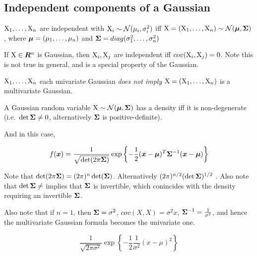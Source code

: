 \begin{tcolorbox}
    \section{Independent components of a Gaussian}
    
    ${\textnormal{X}}_1, \dots, {\textnormal{X}}_n$ are independent with ${\textnormal{X}}_i \sim {\mathcal{N}}(\mu_i, \sigma_i^2)$ iff ${\textnormal{X}} = ({\textnormal{X}}_1, \dots, {\textnormal{X}}_n) \sim {\mathcal{N}}({\bm{\mu}}, {\bm{\Sigma}})$, where ${\bm{\mu}} = (\mu_1, \dots, \mu_n)$ and ${\bm{\Sigma}} = diag(\sigma_1^2, \dots, \sigma_n^2)$
    
    \begin{thm} If ${\textnormal{X}} \in {\bm{R}}^n$ is Gaussian, then ${\textnormal{X}}_i, {\textnormal{X}}_j$ are independent iff $cov({\textnormal{X}}_i, {\textnormal{X}}_j) = 0$. Note this is not true in general, and is a special property of the Gaussian.
    
    \end{thm}
    
    \begin{thm}
    ${\textnormal{X}}_1, \dots, {\textnormal{X}}_n$ each univariate Gaussian \emph{does not imply} ${\textnormal{X}} = ({\textnormal{X}}_1, \dots, {\textnormal{X}}_n)$ is a multivariate Gaussian.
    
    \end{thm}
    
    \begin{thm}
    A Gaussian random variable ${\textnormal{X}} \sim {\mathcal{N}}({\bm{\mu}}, {\bm{\Sigma}})$ has a density iff it is non-degenerate (i.e.\ $\det {\bm{\Sigma}} \neq 0$, alternatively ${\bm{\Sigma}}$ is positive-definite).
    
    And in this case,
    
    \begin{equation}
        f({\bm{x}}) = \frac{1}{\sqrt{\det(2 \pi {\bm{\Sigma}})}} \exp{ \left\{ - \frac{1}{2} ({\bm{x}}- {\bm{\mu}})^T {\bm{\Sigma}}^{-1} ({\bm{x}}- {\bm{\mu}}) \right\} }
    \end{equation}
    
    Note that $\det(2 \pi {\bm{\Sigma}}) = (2\pi)^n \det({\bm{\Sigma}})$. Alternatively $(2 \pi)^{n/2} (\det {\bm{\Sigma}})^{1/2}$ . Also note that $\det {\bm{\Sigma}} \neq$ implies that ${\bm{\Sigma}}$ is invertible, which conincides with the density requiring an invertible ${\bm{\Sigma}}$.
    
    Also note that if $n = 1$, then ${\bm{\Sigma}} = \sigma^2$, $cov(X, X) = \sigma^2 x$, ${\bm{\Sigma}}^{-1} = \frac{1}{\sigma^2}$, and hence the multivariate Gaussian formula becomes the univariate one.
    
    \begin{equation}
        \frac{1}{\sqrt{2 \pi \sigma^2}} \exp{\left\{ - \frac{1}{2} \frac{1}{\sigma^2} (x - \mu)^2\right\}}
    \end{equation}
    \end{thm}
    

\end{tcolorbox}
